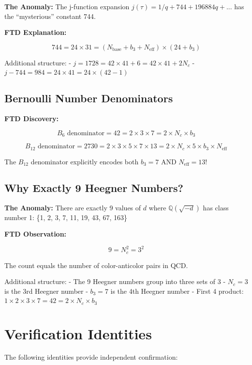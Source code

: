 \documentclass[
  11pt,
  letterpaper,
  twoside,
  openright]{book}
\begin{document}
\textbf{The Anomaly:} The j-function expansion
\(j(\tau) = 1/q + 744 + 196884q + ...\) has the ``mysterious'' constant
744.

\textbf{FTD Explanation:}

\[744 = 24 \times 31 = (N_{\text{base}} + b_3 + N_{\text{eff}}) \times (24 + b_3)\]

Additional structure: -
\(j = 1728 = 42 \times 41 + 6 = 42 \times 41 + 2N_c\) -
\(j - 744 = 984 = 24 \times 41 = 24 \times (42 - 1)\)

\subsection{Bernoulli Number
Denominators}\label{bernoulli-number-denominators}

\textbf{FTD Discovery:}

\[B_6 \text{ denominator} = 42 = 2 \times 3 \times 7 = 2 \times N_c \times b_3\]

\[B_{12} \text{ denominator} = 2730 = 2 \times 3 \times 5 \times 7 \times 13 = 2 \times N_c \times 5 \times b_3 \times N_{\text{eff}}\]

The \(B_{12}\) denominator explicitly encodes both \(b_3 = 7\) AND
\(N_{\text{eff}} = 13\)!

\subsection{Why Exactly 9 Heegner
Numbers?}\label{why-exactly-9-heegner-numbers}

\textbf{The Anomaly:} There are exactly 9 values of \(d\) where
\(\mathbb{Q}(\sqrt{-d})\) has class number 1: \{1, 2, 3, 7, 11, 19, 43,
67, 163\}

\textbf{FTD Observation:}

\[9 = N_c^2 = 3^2\]

The count equals the number of color-anticolor pairs in QCD.

Additional structure: - The 9 Heegner numbers group into three sets of 3
- \(N_c = 3\) is the 3rd Heegner number - \(b_3 = 7\) is the 4th Heegner
number - First 4 product:
\(1 \times 2 \times 3 \times 7 = 42 = 2 \times N_c \times b_3\)

\section{Verification Identities}\label{verification-identities}

The following identities provide independent confirmation:
\end{document}
